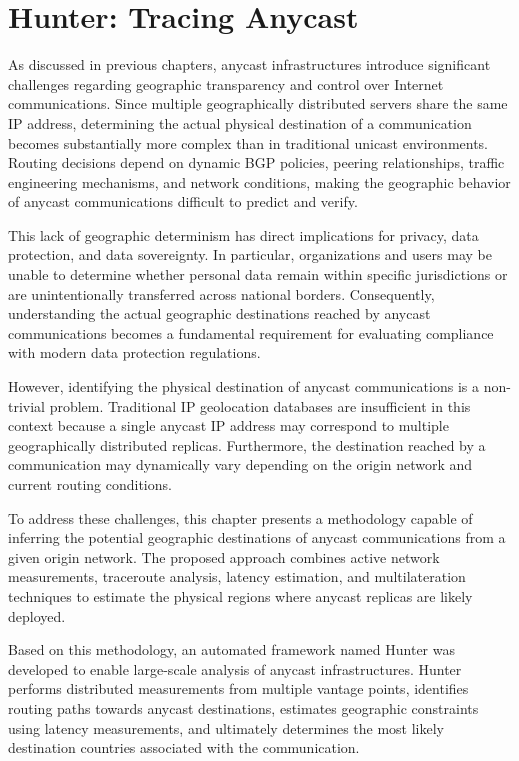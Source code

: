 \chapter{Hunter: Tracing Anycast}
\label{ch:hunter}

As discussed in previous chapters, anycast infrastructures introduce significant challenges regarding geographic transparency and control over Internet communications. Since multiple geographically distributed servers share the same IP address, determining the actual physical destination of a communication becomes substantially more complex than in traditional unicast environments. Routing decisions depend on dynamic BGP policies, peering relationships, traffic engineering mechanisms, and network conditions, making the geographic behavior of anycast communications difficult to predict and verify.

This lack of geographic determinism has direct implications for privacy, data protection, and data sovereignty. In particular, organizations and users may be unable to determine whether personal data remain within specific jurisdictions or are unintentionally transferred across national borders. Consequently, understanding the actual geographic destinations reached by anycast communications becomes a fundamental requirement for evaluating compliance with modern data protection regulations.

However, identifying the physical destination of anycast communications is a non-trivial problem. Traditional IP geolocation databases are insufficient in this context because a single anycast IP address may correspond to multiple geographically distributed replicas. Furthermore, the destination reached by a communication may dynamically vary depending on the origin network and current routing conditions.

To address these challenges, this chapter presents a methodology capable of inferring the potential geographic destinations of anycast communications from a given origin network. The proposed approach combines active network measurements, traceroute analysis, latency estimation, and multilateration techniques to estimate the physical regions where anycast replicas are likely deployed.

Based on this methodology, an automated framework named Hunter was developed to enable large-scale analysis of anycast infrastructures. Hunter performs distributed measurements from multiple vantage points, identifies routing paths towards anycast destinations, estimates geographic constraints using latency measurements, and ultimately determines the most likely destination countries associated with the communication.

